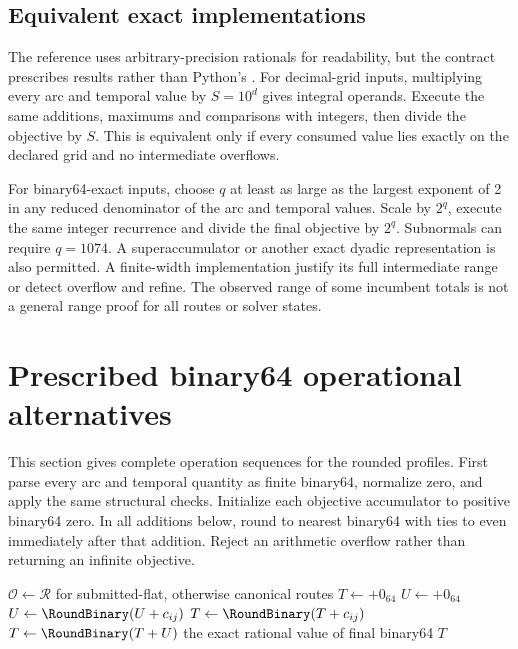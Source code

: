 \subsection{Equivalent exact implementations}
The reference uses arbitrary-precision rationals for readability, but the contract prescribes results rather than Python's . For decimal-grid inputs, multiplying every arc and temporal value by $S=10^d$ gives integral operands. Execute the same additions, maximums and comparisons with integers, then divide the objective by $S$. This is equivalent only if every consumed value lies exactly on the declared grid and no intermediate overflows.

For binary64-exact inputs, choose $q$ at least as large as the largest exponent of 2 in any reduced denominator of the arc and temporal values. Scale by $2^q$, execute the same integer recurrence and divide the final objective by $2^q$. Subnormals can require $q=1074$. A superaccumulator or another exact dyadic representation is also permitted. A finite-width implementation \must{} justify its full intermediate range or detect overflow and refine. The observed range of some incumbent totals is not a general range proof for all routes or solver states.

\section{Prescribed binary64 operational alternatives}\label{sec:rounded}
This section gives complete operation sequences for the rounded profiles. First parse every arc and temporal quantity as finite binary64, normalize zero, and apply the same structural checks. Initialize each objective accumulator to positive binary64 zero. In all additions below, round to nearest binary64 with ties to even immediately after that addition. Reject an arithmetic overflow rather than returning an infinite objective.

\begin{algorithm}[htbp]
\caption{Binary64 objective modes after route validation}
\begin{algorithmic}[1]
\State $\mathcal O\gets\mathcal R$ for submitted-flat, otherwise canonical routes
\State $T\gets+0_{64}$
\State $U\gets+0_{64}$
 \State $U\gets\RoundBinary(U+c_{ij})$
\Else \State $T\gets\RoundBinary(T+c_{ij})$ \EndIf
\EndFor
{} \State $T\gets\RoundBinary(T+U)$ \EndIf
\EndFor
\State \Return the exact rational value of final binary64 $T$
\end{algorithmic}
\end{algorithm}

